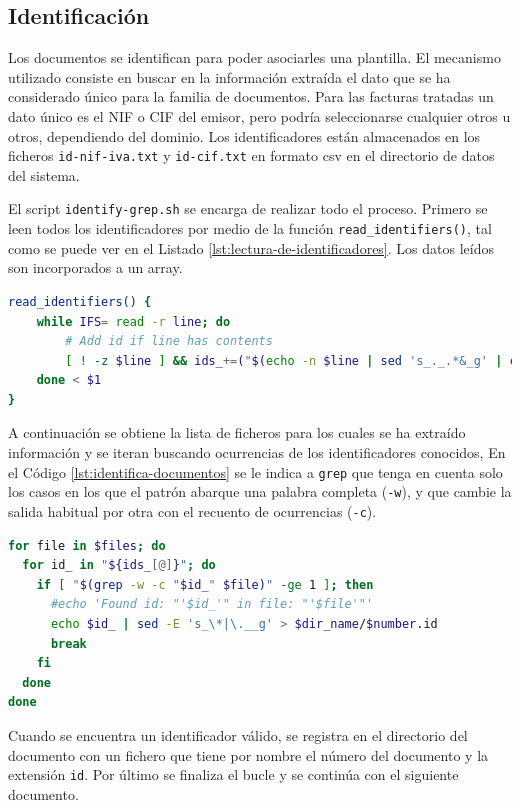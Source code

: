 \subsection{Identificación}
\label{subsec:impl-identificacion}

Los documentos se identifican para poder asociarles una plantilla. El mecanismo utilizado consiste en buscar en la información extraída el dato que se ha considerado único para la familia de documentos. Para las facturas tratadas un dato único es el NIF o CIF del emisor, pero podría seleccionarse cualquier otros u otros, dependiendo del dominio. Los identificadores están almacenados en los ficheros \verb|id-nif-iva.txt| y \verb|id-cif.txt| en formato \acrshort{csv} en el directorio de datos del sistema.

El script \verb|identify-grep.sh| se encarga de realizar todo el proceso. Primero se leen todos los identificadores por medio de la función \verb|read_identifiers()|, tal como se puede ver en el Listado \ref{lst:lectura-de-identificadores}. Los datos leídos son incorporados a un array.

\begin{lstlisting}[language=bash,caption={Lectura de identificadores.},label=lst:lectura-de-identificadores]
read_identifiers() {
    while IFS= read -r line; do
        # Add id if line has contents
        [ ! -z $line ] && ids_+=("$(echo -n $line | sed 's_._.*&_g' | cut -c 3-)")
    done < $1
}
\end{lstlisting}

A continuación se obtiene la lista de ficheros para los cuales se ha extraído información y se iteran buscando ocurrencias de los identificadores conocidos, En el Código \ref{lst:identifica-documentos} se le indica a \verb|grep| que tenga en cuenta solo los casos en los que el patrón abarque una palabra completa (\verb|-w|), y que cambie la salida habitual por otra con el recuento de ocurrencias (\verb|-c|).

\begin{lstlisting}[language=bash,caption={Identificación de los documentos.},label=lst:identifica-documentos]
for file in $files; do
  for id_ in "${ids_[@]}"; do
    if [ "$(grep -w -c "$id_" $file)" -ge 1 ]; then
      #echo 'Found id: "'$id_'" in file: "'$file'"'
      echo $id_ | sed -E 's_\*|\.__g' > $dir_name/$number.id
      break
    fi
  done
done
\end{lstlisting}

Cuando se encuentra un identificador válido, se registra en el directorio del documento con un fichero que tiene por nombre el número del documento y la extensión \verb|id|. Por último se finaliza el bucle y se continúa con el siguiente documento.

